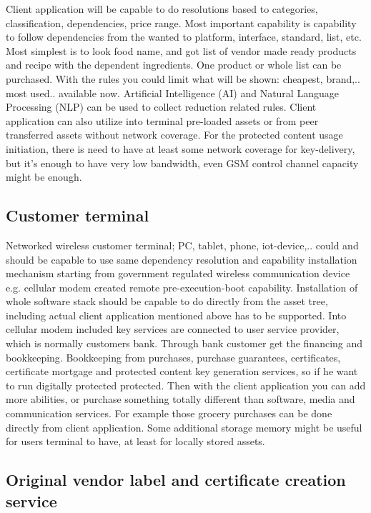 Client application will be capable to do resolutions based to categories, classification, dependencies, price range. Most important capability is capability to follow dependencies from the wanted to platform, interface, standard, list, etc. Most simplest is to look food name, and got list of vendor made ready products and recipe with the dependent ingredients. One product or whole list can be purchased. With the rules you could limit what will be shown: cheapest, brand,.. most used.. available now. Artificial Intelligence (AI) and Natural Language Processing (NLP) can be used to collect reduction related rules. Client application can also utilize into terminal pre-loaded assets or from peer transferred assets without network coverage. For the protected content usage initiation, there is need to have at least some network coverage for key-delivery, but it's enough to have very low bandwidth, even GSM control channel capacity might be enough.

\subsection{Customer terminal}
\label{customer_terminal}

Networked wireless customer terminal; PC, tablet, phone, iot-device,.. could and should be capable to use same dependency resolution and capability installation mechanism starting from government regulated wireless communication device e.g. cellular modem created remote pre-execution-boot capability. Installation of whole software stack should be capable to do directly from the asset tree, including actual client application mentioned above has to be supported. Into cellular modem included key services are connected to user service provider, which is normally customers bank. Through bank customer get the financing and bookkeeping. Bookkeeping from purchases, purchase guarantees, certificates, certificate mortgage and protected content key generation services, so if he want to run digitally protected protected. Then with the client application you can add more abilities, or purchase something totally different than software, media and communication services.  For example those grocery purchases can be done directly from client application. Some additional storage memory might be useful for users terminal to have, at least for locally stored assets.

\subsection{Original vendor label and certificate creation service}
\label{label_and_certificate_service}

